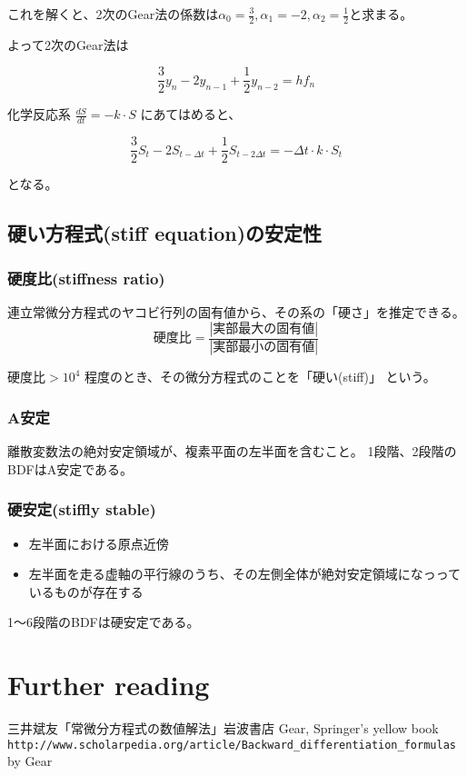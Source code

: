 これを解くと、2次のGear法の係数は\(\alpha_0 = \frac{3}{2}, \alpha_1 = -2, \alpha_2 = \frac{1}{2}\)と求まる。

よって2次のGear法は

\[\frac{3}{2} y_{n} - 2 y_{n-1} + \frac{1}{2} y_{n-2} = h f_{n}\]

化学反応系 \(\displaystyle\frac{dS}{dt} = -k \cdot S\) にあてはめると、

\[\frac{3}{2} S_t  - 2 S_{t-\Delta t}  + \frac{1}{2} S_{t-2\Delta t}= - \Delta t \cdot k \cdot S_{t}\]

となる。


\subsection{硬い方程式(stiff equation)の安定性}
\subsubsection{硬度比(stiffness ratio)}
連立常微分方程式のヤコビ行列の固有値から、その系の「硬さ」を推定できる。\\

\[ \mbox{硬度比} = \frac{|\mbox{実部最大の固有値}|}{|\mbox{実部最小の固有値}|} \]

\(\mbox{硬度比} > 10^4\) 程度のとき、その微分方程式のことを「硬い(stiff)」 という。

\subsubsection{A安定}
離散変数法の絶対安定領域が、複素平面の左半面を含むこと。
1段階、2段階のBDFはA安定である。

\subsubsection{硬安定(stiffly stable)}
\begin{itemize}
\item 左半面における原点近傍
\item 左半面を走る虚軸の平行線のうち、その左側全体が絶対安定領域になっっているものが存在する
\end{itemize}

1〜6段階のBDFは硬安定である。

\section{Further reading}
三井斌友「常微分方程式の数値解法」岩波書店
Gear, Springer's yellow book
\verb+http://www.scholarpedia.org/article/Backward_differentiation_formulas+ by Gear